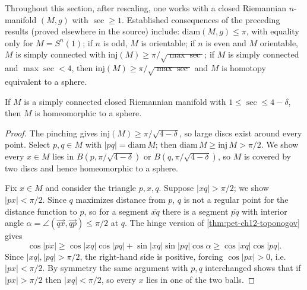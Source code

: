 Throughout this section, after rescaling, one works with a closed Riemannian
$n$-manifold $(M,g)$ with $\sec\ge1$. Established consequences of the preceding
results (proved elsewhere in the source) include: $\mathrm{diam}(M,g)\le\pi$,
with equality only for $M=S^n(1)$; if $n$ is odd, $M$ is orientable; if $n$ is
even and $M$ orientable, $M$ is simply connected with
$\mathrm{inj}(M)\ge\pi/\sqrt{\max\sec}$; if $M$ is simply connected and
$\max\sec<4$, then $\mathrm{inj}(M)\ge\pi/\sqrt{\max\sec}$ and $M$ is homotopy
equivalent to a sphere.

\begin{theorem}
  \label{thm:pet-ch12-quarter-pinched-sphere}
  If $M$ is a simply connected closed Riemannian manifold with
  $1\le\sec\le4-\delta$, then $M$ is homeomorphic to a sphere.
\end{theorem}
\begin{proof}
  The pinching gives $\mathrm{inj}(M)\ge\pi/\sqrt{4-\delta}$, so large discs
  exist around every point. Select $p,q\in M$ with $|pq|=\mathrm{diam}\,M$; then
  $\mathrm{diam}\,M\ge\mathrm{inj}\,M>\pi/2$. We show every $x\in M$ lies in
  $B(p,\pi/\sqrt{4-\delta})$ or $B(q,\pi/\sqrt{4-\delta})$, so $M$ is covered by
  two discs and hence homeomorphic to a sphere.

  Fix $x\in M$ and consider the triangle $p,x,q$. Suppose $|xq|>\pi/2$; we show
  $|px|<\pi/2$. Since $q$ maximizes distance from $p$, $q$ is not a regular
  point for the distance function to $p$, so for a segment $\overline{xq}$
  there is a segment $\overline{pq}$ with interior angle
  $\alpha=\angle(\overrightarrow{qx},\overrightarrow{qp})\le\pi/2$ at $q$. The
  hinge version of \cref{thm:pet-ch12-toponogov} gives
  \[
    \cos|px|\ge\cos|xq|\cos|pq|+\sin|xq|\sin|pq|\cos\alpha\ge\cos|xq|\cos|pq|.
  \]
  Since $|xq|,|pq|>\pi/2$, the right-hand side is positive, forcing
  $\cos|px|>0$, i.e.\ $|px|<\pi/2$. By symmetry the same argument with $p,q$
  interchanged shows that if $|px|>\pi/2$ then $|xq|<\pi/2$, so every $x$ lies
  in one of the two balls.
\end{proof}

